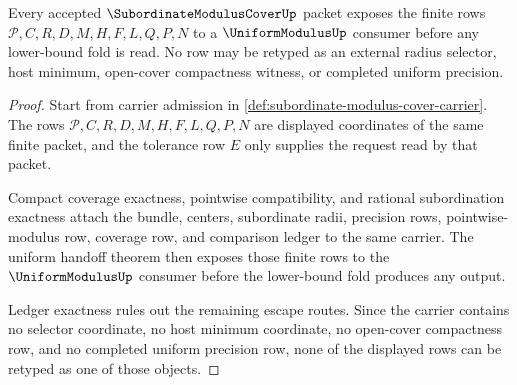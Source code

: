 \begin{theorem}
\label{thm:subordinate-modulus-cover-choice-free-handoff}
Every accepted $\SubordinateModulusCoverUp$ packet exposes the finite rows $\mathcal{P},C,R,D,M,H,F,L,Q,P,N$ to a $\UniformModulusUp$ consumer before any lower-bound fold is read. No row may be retyped as an external radius selector, host minimum, open-cover compactness witness, or completed uniform precision.
\end{theorem}
\begin{proof}
Start from carrier admission in \autoref{def:subordinate-modulus-cover-carrier}. The rows $\mathcal{P},C,R,D,M,H,F,L,Q,P,N$ are displayed coordinates of the same finite packet, and the tolerance row $E$ only supplies the request read by that packet.

Compact coverage exactness, pointwise compatibility, and rational subordination exactness attach the bundle, centers, subordinate radii, precision rows, pointwise-modulus row, coverage row, and comparison ledger to the same carrier. The uniform handoff theorem then exposes those finite rows to the $\UniformModulusUp$ consumer before the lower-bound fold produces any output.

Ledger exactness rules out the remaining escape routes. Since the carrier contains no selector coordinate, no host minimum coordinate, no open-cover compactness row, and no completed uniform precision row, none of the displayed rows can be retyped as one of those objects.
\end{proof}

